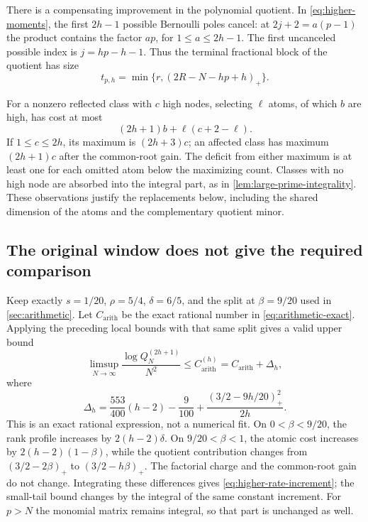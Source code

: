 \documentclass[11pt,letterpaper]{article}
\theoremstyle{definition}
\newcommand{\arith}{\mathrm{arith}}
\newcommand{\pos}[1]{\left(#1\right)_{+}}
\begin{document}
There is a compensating improvement in the polynomial quotient.
In \eqref{eq:higher-moments}, the first $2h-1$ possible Bernoulli
poles cancel: at $2j+2=a(p-1)$ the product contains the factor $ap$,
for $1\le a\le2h-1$. The first uncanceled possible index is
$j=hp-h-1$. Thus the terminal fractional block of the quotient has size
\begin{equation}\label{eq:higher-terminal-block}
 t_{p,h}=\min\{r,\pos{2R-N-hp+h}\}.
\end{equation}

For a nonzero reflected class with $c$ high nodes, selecting $\ell$
atoms, of which $b$ are high, has cost at most
\[
 (2h+1)b+\ell(c+2-\ell).
\]
If $1\le c\le2h$, its maximum is $(2h+3)c$; an affected class has maximum
$(2h+1)c$ after the common-root gain. The deficit from either maximum
is at least one for each omitted atom below the maximizing count.
Classes with no high node are absorbed into the integral part, as in
\cref{lem:large-prime-integrality}.
These observations justify the replacements below, including the
shared dimension of the atoms and the complementary quotient minor.

\subsection{The original window does not give the required comparison}

Keep exactly
$s=1/20$, $\rho=5/4$, $\delta=6/5$, and the split at $\beta=9/20$
used in \cref{sec:arithmetic}. Let $C_{\arith}$ be the exact rational
number in \eqref{eq:arithmetic-exact}. Applying the preceding local
bounds with that same split gives a valid upper bound
\begin{equation}\label{eq:higher-arithmetic-rate}
 \limsup_{N\to\infty}\frac{\log Q_N^{(2h+1)}}{N^2}
 \le C_{\arith}^{(h)}=C_{\arith}+\Delta_h,
\end{equation}
where
\begin{equation}\label{eq:higher-rate-increment}
 \Delta_h=
 \frac{553}{400}(h-2)-\frac9{100}
 +\frac{\pos{3/2-9h/20}^{2}}{2h}.
\end{equation}
This is an exact rational expression, not a numerical fit.
On $0<\beta<9/20$, the rank profile increases by
$2(h-2)\delta$. On $9/20<\beta<1$, the atomic cost increases by
$2(h-2)(1-\beta)$, while the quotient contribution changes from
$(3/2-2\beta)_+$ to $(3/2-h\beta)_+$. The factorial charge and
the common-root gain do not change. Integrating these differences
gives \eqref{eq:higher-rate-increment}; the small-tail bound changes
by the integral of the same constant increment. For $p>N$ the
monomial matrix remains integral, so that part is unchanged as well.
\end{document}
